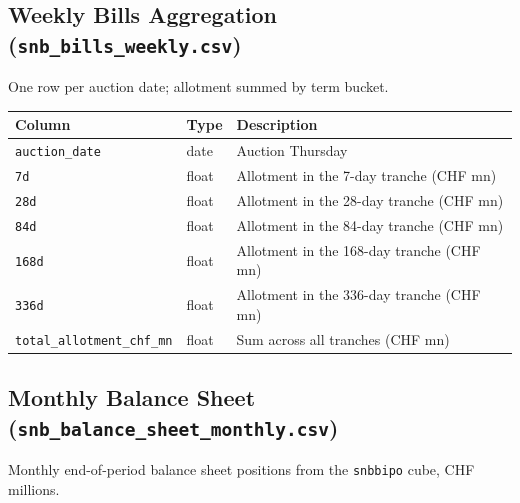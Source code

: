\documentclass[12pt,a4paper]{article}
\begin{document}
\subsection{Weekly Bills Aggregation (\texttt{snb\_bills\_weekly.csv})}

One row per auction date; allotment summed by term bucket.

\begin{center}
\begin{tabular}{L{4.2cm} L{2.5cm} L{7.1cm}}
  \toprule
  \textbf{Column} & \textbf{Type} & \textbf{Description} \\
  \midrule
  \texttt{auction\_date}          & date  & Auction Thursday \\
  \texttt{7d}                     & float & Allotment in the 7-day tranche (CHF mn) \\
  \texttt{28d}                    & float & Allotment in the 28-day tranche (CHF mn) \\
  \texttt{84d}                    & float & Allotment in the 84-day tranche (CHF mn) \\
  \texttt{168d}                   & float & Allotment in the 168-day tranche (CHF mn) \\
  \texttt{336d}                   & float & Allotment in the 336-day tranche (CHF mn) \\
  \texttt{total\_allotment\_chf\_mn} & float & Sum across all tranches (CHF mn) \\
  \bottomrule
\end{tabular}
\end{center}

\subsection{Monthly Balance Sheet (\texttt{snb\_balance\_sheet\_monthly.csv})}

Monthly end-of-period balance sheet positions from the \texttt{snbbipo} cube,
CHF millions.
\end{document}
